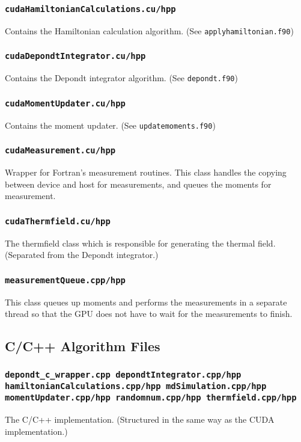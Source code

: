 \documentclass{article}
\begin{document}
\subsubsection{\texttt{cudaHamiltonianCalculations.cu/hpp}}
Contains the Hamiltonian calculation algorithm. (See \verb|applyhamiltonian.f90|)

\subsubsection{\texttt{cudaDepondtIntegrator.cu/hpp}}
Contains the Depondt integrator algorithm. (See \verb|depondt.f90|)

\subsubsection{\texttt{cudaMomentUpdater.cu/hpp}}
Contains the moment updater. (See \verb|updatemoments.f90|)

\subsubsection{\texttt{cudaMeasurement.cu/hpp}}
Wrapper for Fortran’s measurement routines. This class handles the copying between device and host for measurements, and queues the moments for measurement.

\subsubsection{\texttt{cudaThermfield.cu/hpp}}
The thermfield class which is responsible for generating the thermal field. (Separated from the Depondt integrator.)

\subsubsection{\texttt{measurementQueue.cpp/hpp}}
This class queues up moments and performs the measurements in a separate thread so that the GPU does not have to wait for the measurements to finish.

\subsection{C/C++ Algorithm Files}

\subsubsection{\texttt{depondt\_c\_wrapper.cpp
depondtIntegrator.cpp/hpp
hamiltonianCalculations.cpp/hpp
mdSimulation.cpp/hpp
momentUpdater.cpp/hpp
randomnum.cpp/hpp
thermfield.cpp/hpp}}
The C/C++ implementation. (Structured in the same way as the CUDA implementation.)
\end{document}

